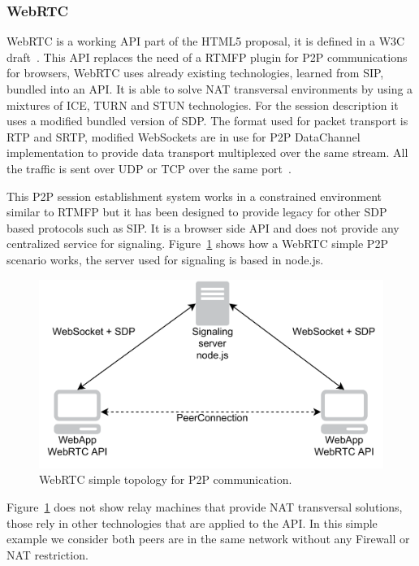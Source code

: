 \subsubsection{WebRTC}

WebRTC is a working API part of the HTML5 proposal, it is defined in a W3C draft~\cite{webrtcW3cgroup}. This API replaces the need of a RTMFP plugin for P2P communications for browsers, WebRTC uses already existing technologies, learned from SIP, bundled into an API. It is able to solve NAT transversal environments by using a mixtures of ICE, TURN and STUN technologies. For the session description it uses a modified bundled version of SDP. The format used for packet transport is RTP and SRTP, modified WebSockets are in use for P2P DataChannel implementation to provide data transport multiplexed over the same stream. All the traffic is sent over UDP or TCP over the same port~\cite{alvestrandOverview2012}.

This P2P session establishment system works in a constrained environment similar to RTMFP but it has been designed to provide legacy for other SDP based protocols such as SIP. It is a browser side API and does not provide any centralized service for signaling. Figure~\ref{fig:webrtcExample} shows how a WebRTC simple P2P scenario works, the server used for signaling is based in node.js.

 \begin{figure}[h]
  \centering
    \includegraphics[width=1\textwidth]{./figures/webrtcExample.pdf}
      \caption[WebRTC simple topology for P2P communication]{WebRTC simple topology for P2P communication.}
	\label{fig:webrtcExample}
\end{figure}

Figure~\ref{fig:webrtcExample} does not show relay machines that provide NAT transversal solutions, those rely in other technologies that are applied to the API. In this simple example we consider both peers are in the same network without any Firewall or NAT restriction.


